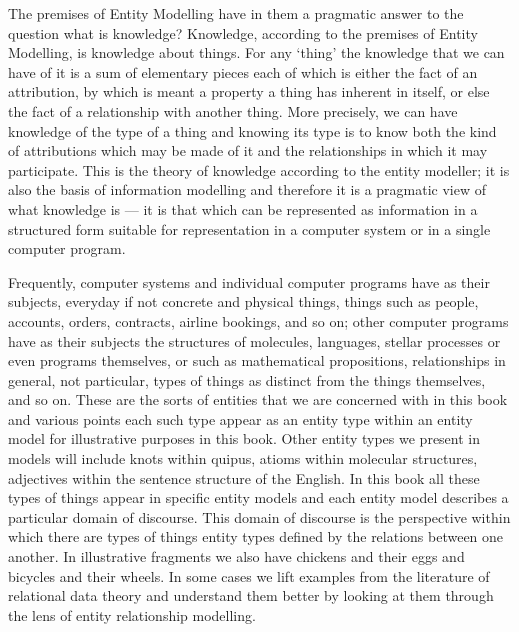 The premises of Entity Modelling have in them a pragmatic answer to the question what is knowledge? Knowledge, according to the premises of Entity Modelling, is knowledge about things. For any ‘thing’ the knowledge that we can have of it is a sum of elementary pieces each of which is either the fact of an attribution, by which is meant a property a thing has inherent in itself, or else the fact of a relationship with another thing. More precisely, we can have knowledge of the type of a thing and knowing its type is to know both the kind of attributions which may be made of it and the relationships in which it may participate. This is the theory of knowledge according to the entity modeller; it is also the basis of information modelling and therefore it is a pragmatic view of what knowledge is — it is that which can be represented as information in a structured form suitable for representation in a computer system or in a single computer program.

Frequently, computer systems and individual computer programs have as their subjects, everyday if not concrete and physical things, things such as people, accounts, orders, contracts, airline bookings, and so on; other computer programs have as their subjects the structures of molecules, languages, stellar processes or even programs themselves, or such as mathematical propositions, relationships in general, not particular, types of things as distinct from the things themselves, and so on. These are the sorts of entities that we are concerned with in this book and various points each such type appear as an entity type within an entity model for illustrative purposes in this book. Other entity types we present in models will include knots within quipus, atioms within molecular structures, adjectives within the sentence structure of the English. In this book all these types of things appear in specific entity models and each entity model describes a particular domain of discourse. This domain of discourse is the perspective within which there are types of things entity types defined by the relations between one another. In illustrative fragments we also have chickens and their eggs and bicycles and their wheels. In some cases we lift examples from the literature of relational data theory and understand them better by looking at them through the lens of entity relationship modelling.



